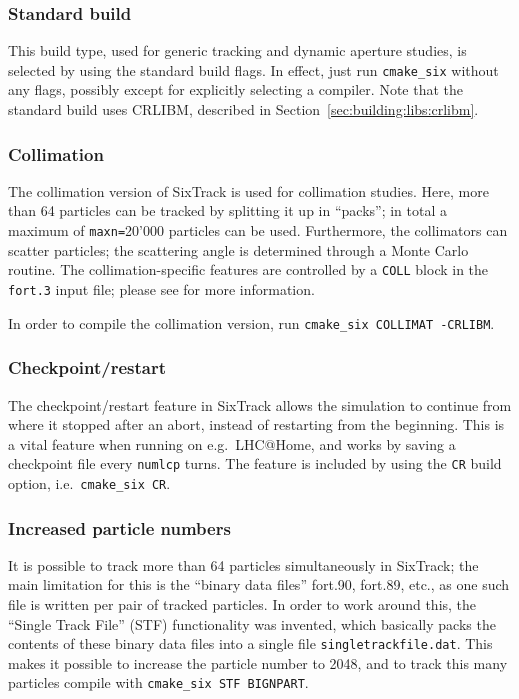 \documentclass[english]{article}
\begin{document}
\subsubsection{Standard build}
This build type, used for generic tracking and dynamic aperture studies, is selected by using the standard build flags.
In effect, just run \texttt{cmake\_six} without any flags, possibly except for explicitly selecting a compiler.
Note that the standard build uses CRLIBM, described in Section~\ref{sec:building:libs:crlibm}.

\subsubsection{Collimation}
The collimation version of SixTrack is used for collimation studies.
Here, more than 64 particles can be tracked by splitting it up in ``packs''; in total a maximum of \texttt{maxn=}20'000 particles can be used.
Furthermore, the collimators can scatter particles; the scattering angle is determined through a Monte Carlo routine.
The collimation-specific features are controlled by a \texttt{COLL} block in the \texttt{fort.3} input file; please see  for more information.

In order to compile the collimation version, run \texttt{cmake\_six COLLIMAT -CRLIBM}.


\subsubsection{Checkpoint/restart}
The checkpoint/restart feature in SixTrack allows the simulation to continue from where it stopped after an abort, instead of restarting from the beginning.
This is a vital feature when running on e.g.\ LHC@Home, and works by saving a checkpoint file every \texttt{numlcp} turns.
The feature is included by using the \texttt{CR} build option, i.e.\ \texttt{cmake\_six CR}.

\subsubsection{Increased particle numbers}
It is possible to track more than 64 particles simultaneously in SixTrack; the main limitation for this is the ``binary data files'' fort.90, fort.89, etc., as one such file is written per pair of tracked particles.
In order to work around this, the ``Single Track File'' (STF) functionality was invented, which basically packs the contents of these binary data files into a single file \texttt{singletrackfile.dat}.
This makes it possible to increase the particle number to 2048, and to track this many particles compile with \texttt{cmake\_six STF BIGNPART}.
\end{document}
